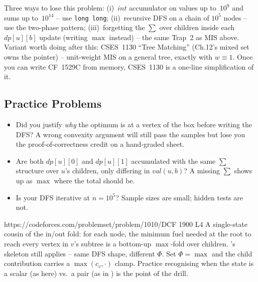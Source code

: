 \begin{warningbox}
Three ways to lose this problem: (i)~$\mathit{int}$ accumulator on values up
to~$10^{9}$ and sums up to~$10^{14}$ -- use \lstinline{long long};
(ii)~recursive DFS on a chain of $10^{5}$ nodes -- use the two-phase
 pattern; (iii)~forgetting the $\sum$ over children
inside each $\mathit{dp}[u][b]$ update (writing $\max$ instead) -- the same
Trap~2 as MIS above. Variant worth doing after this: CSES~1130 ``Tree
Matching'' (Ch.12's mixed set owns the pointer) -- unit-weight MIS on a
general tree, exactly  with $w\equiv 1$. Once you can
write CF~1529C from memory, CSES~1130 is a one-line simplification of it.
\end{warningbox}

\subsection{Practice Problems}

\begin{stuckbox}
\begin{itemize}[nosep, leftmargin=1.4em]
  \item Did you justify \emph{why} the optimum is at a vertex of the box
        before writing the DFS? A wrong convexity argument will still pass
        the samples but lose you the proof-of-correctness credit on a
        hand-graded sheet.
  \item Are both $\mathit{dp}[u][0]$ and $\mathit{dp}[u][1]$ accumulated
        with the same $\sum$ structure over $u$'s children, only differing
        in $\mathit{val}(u,b)$? A missing $\sum$ shows up as $\max$ where
        the total should be.
  \item Is your DFS iterative at $n=10^{5}$? Sample sizes are small;
        hidden tests are not.
\end{itemize}
\end{stuckbox}

\begin{practiceset}
    {https://codeforces.com/problemset/problem/1010/D}{CF 1900 L4}
    {A single-state cousin of the in/out fold: for each node, the
    minimum fuel needed at the root to reach every vertex in $v$'s
    subtree is a bottom-up $\max$-fold over children.
    's skeleton still applies -- same DFS shape,
    different $\Phi$. Set $\Phi=\max$ and the child contribution
    carries a $\max(c_v, \cdot)$ clamp. Practice recognising when
    the state is a scalar (as here) vs.\ a pair (as in
    ) is the point of the drill.}
\end{practiceset}

